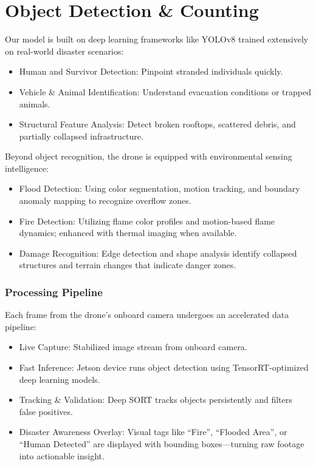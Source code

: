\documentclass[12pt]{report}
\begin{document}
    \section{Object Detection \& Counting}
    Our model is built on deep learning frameworks like YOLOv8  trained extensively on real-world disaster scenarios:
\begin{itemize}
  \item Human and Survivor Detection: Pinpoint stranded individuals quickly.
  \item Vehicle \& Animal Identification: Understand evacuation conditions or trapped animals.
  \item Structural Feature Analysis: Detect broken rooftops, scattered debris, and partially collapsed infrastructure.
\end{itemize}

Beyond object recognition, the drone is equipped with environmental sensing intelligence:
\begin{itemize}
  \item Flood Detection: Using color segmentation, motion tracking, and boundary anomaly mapping to recognize overflow zones.
  \item Fire Detection: Utilizing flame color profiles and motion-based flame dynamics; enhanced with thermal imaging when available.
  \item Damage Recognition: Edge detection and shape analysis identify collapsed structures and terrain changes that indicate danger zones.
\end{itemize}

\subsubsection{\large Processing Pipeline}
Each frame from the drone's onboard camera undergoes an accelerated data pipeline:
\begin{itemize}
  \item Live Capture: Stabilized image stream from onboard camera.
  \item Fast Inference: Jetson device runs object detection using TensorRT-optimized deep learning models.
  \item Tracking \& Validation: Deep SORT tracks objects persistently and filters false positives.
  \item Disaster Awareness Overlay: Visual tags like “Fire”, “Flooded Area”, or “Human Detected” are displayed with bounding boxes—turning raw footage into actionable insight.
\end{itemize}
\end{document}
